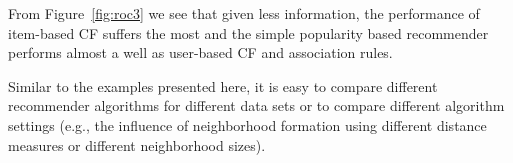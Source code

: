 \documentclass[nojss]{jss}
\begin{document}
From Figure~\ref{fig:roc3} we see that given less information,
the performance of item-based CF suffers the most and the simple
popularity based recommender performs almost a well as user-based CF and
association rules.

Similar to the examples presented here, it is easy to compare different
recommender algorithms for different data sets or to compare
different algorithm settings (e.g.,
the influence of neighborhood formation using different distance measures or different neighborhood sizes).


%
%
%
%
%
%
%
%
%


\end{document}
